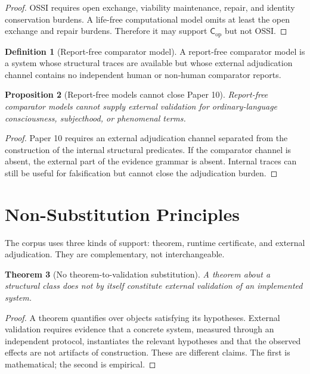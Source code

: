 \documentclass[11pt,a4paper]{article}
\newtheorem{theorem}{Theorem}[section]
\newtheorem{proposition}[theorem]{Proposition}
\theoremstyle{definition}
\newtheorem{definition}[theorem]{Definition}
\newcommand{\Cop}{\mathsf{C}_{\mathrm{op}}}
\begin{document}
\begin{proof}
OSSI requires open exchange, viability maintenance, repair, and identity
conservation burdens. A life-free computational model omits at least the open
exchange and repair burdens. Therefore it may support $\Cop$ but not OSSI.
\end{proof}

\begin{definition}[Report-free comparator model]
A report-free comparator model is a system whose structural traces are
available but whose external adjudication channel contains no independent
human or non-human comparator reports.
\end{definition}

\begin{proposition}[Report-free models cannot close Paper 10]
Report-free comparator models cannot supply external validation for
ordinary-language consciousness, subjecthood, or phenomenal terms.
\end{proposition}

\begin{proof}
Paper 10 requires an external adjudication channel separated from the
construction of the internal structural predicates. If the comparator channel
is absent, the external part of the evidence grammar is absent. Internal traces
can still be useful for falsification but cannot close the adjudication burden.
\end{proof}

\section{Non-Substitution Principles}

The corpus uses three kinds of support: theorem, runtime certificate, and
external adjudication. They are complementary, not interchangeable.

\begin{theorem}[No theorem-to-validation substitution]
A theorem about a structural class does not by itself constitute external
validation of an implemented system.
\end{theorem}

\begin{proof}
A theorem quantifies over objects satisfying its hypotheses. External
validation requires evidence that a concrete system, measured through an
independent protocol, instantiates the relevant hypotheses and that the
observed effects are not artifacts of construction. These are different
claims. The first is mathematical; the second is empirical.
\end{proof}
\end{document}
